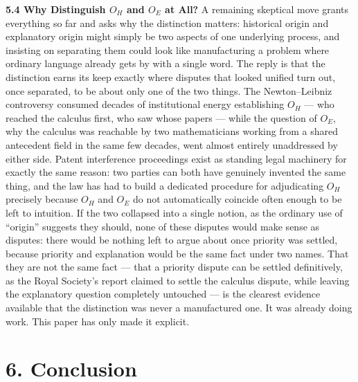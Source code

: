 \documentclass[11pt]{article}
\theoremstyle{plain}
\begin{document}
\textbf{5.4 Why Distinguish \(O_H\) and \(O_E\) at All?} A remaining skeptical move grants everything so far and asks why the distinction matters: historical origin and explanatory origin might simply be two aspects of one underlying process, and insisting on separating them could look like manufacturing a problem where ordinary language already gets by with a single word. The reply is that the distinction earns its keep exactly where disputes that looked unified turn out, once separated, to be about only one of the two things. The Newton--Leibniz controversy consumed decades of institutional energy establishing \(O_H\) --- who reached the calculus first, who saw whose papers --- while the question of \(O_E\), why the calculus was reachable by two mathematicians working from a shared antecedent field in the same few decades, went almost entirely unaddressed by either side. Patent interference proceedings exist as standing legal machinery for exactly the same reason: two parties can both have genuinely invented the same thing, and the law has had to build a dedicated procedure for adjudicating \(O_H\) precisely because \(O_H\) and \(O_E\) do not automatically coincide often enough to be left to intuition. If the two collapsed into a single notion, as the ordinary use of ``origin'' suggests they should, none of these disputes would make sense as disputes: there would be nothing left to argue about once priority was settled, because priority and explanation would be the same fact under two names. That they are not the same fact --- that a priority dispute can be settled definitively, as the Royal Society's report claimed to settle the calculus dispute, while leaving the explanatory question completely untouched --- is the clearest evidence available that the distinction was never a manufactured one. It was already doing work. This paper has only made it explicit.

\section*{6. Conclusion}
\end{document}

